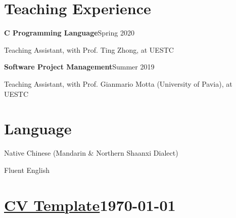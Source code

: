 \documentclass{article}
\begin{document}






\section*{Teaching Experience}
\indent


\textbf{C Programming Language}\hfill Spring 2020

\hspace{2em}Teaching Assistant, with Prof. Ting Zhong, at UESTC

\textbf{Software Project Management}\hfill Summer 2019

\hspace{2em}Teaching Assistant, with Prof. Gianmario Motta (University of Pavia), at UESTC








\section*{Language}
\indent

Native Chinese (Mandarin \& Northern Shaanxi Dialect)

Fluent English





\vfill

\section*{\color{OliveGreen}\href{https://github.com/Xovee/latex-cv}{CV Template}\hfill\today}
\end{document}
